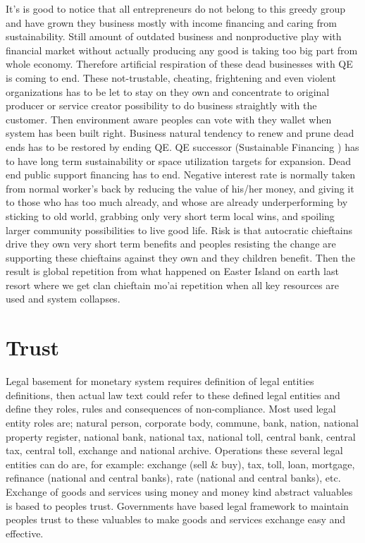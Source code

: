 It's is good to notice that all entrepreneurs do not belong to this greedy
group and have grown they business mostly with income financing and caring
from sustainability. Still amount of outdated business and nonproductive play
with financial market without actually producing any good is taking too big
part from whole economy. Therefore artificial respiration of these dead
businesses with QE is coming to end. These not-trustable, cheating,
frightening and even violent organizations has to be let to stay on they own
and concentrate to original producer or service creator possibility to do
business straightly with the customer. Then environment aware peoples can vote
with they wallet when system has been built right. Business natural tendency
to renew and prune dead ends has to be restored by ending QE. QE successor
(Sustainable Financing \cite{EU_Sustainable_finance}) has to have long term
sustainability or space utilization targets for expansion. Dead end public
support financing has to end. Negative interest rate is normally taken from
normal worker's back by reducing the value of his/her money, and giving it to
those who has too much already, and whose are already underperforming by
sticking to old world, grabbing only very short term local wins, and spoiling
larger community possibilities to live good life. Risk is that autocratic
chieftains drive they own very short term benefits and peoples resisting the
change are supporting these chieftains against they own and they children
benefit. Then the result is global repetition from what happened on Easter
Island on earth last resort where we get clan chieftain mo'ai repetition when
all key resources are used and system collapses.

\section{Trust}\label{trust}
Legal basement for monetary system requires definition of legal entities
definitions, then actual law text could refer to these defined legal entities
and define they roles, rules and consequences of non-compliance. Most used
legal entity roles are; natural person, corporate body, commune, bank, nation,
national property register, national bank, national tax, national toll,
central bank, central tax, central toll, exchange and national archive.
Operations these several legal entities can do are, for example: exchange
(sell \& buy), tax, toll, loan, mortgage, refinance (national and central
banks), rate (national and central banks), etc. Exchange of goods and services
using money and money kind abstract valuables is based to peoples trust.
Governments have based legal framework to maintain peoples trust to these
valuables to make goods and services exchange easy and effective.

